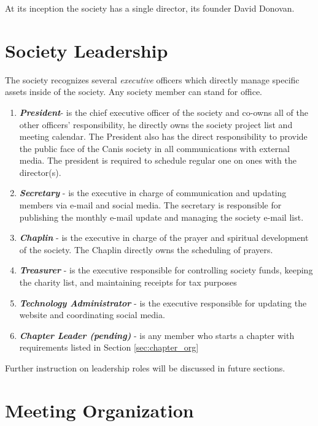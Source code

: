 \documentclass[]{article}
\begin{document}
\noindent 
At its inception the society has a single director, its founder David Donovan. 

\clearpage

\section{Society Leadership}
\label{sec:leadership}

The society recognizes several \textit{executive} officers which directly manage specific assets inside of the society. Any society member can stand for office. 

\begin{enumerate}
	\item \textbf{\textit{President}}- is the chief executive officer of the society and co-owns all of the other officers' responsibility, he directly owns the society project list and meeting calendar. The President also has the direct responsibility to provide the public face of the Canis society in all communications with external media. The president is required to schedule regular one on ones with the director(s).
	\item \textbf{\textit{Secretary}} - is the executive in charge of communication and updating members via e-mail and social media. The secretary is responsible for publishing the monthly e-mail update and managing the society e-mail list.
	\item \textbf{\textit{Chaplin}} - is the executive in charge of the prayer and spiritual development of the society. The Chaplin directly owns the scheduling of prayers. 
	\item \textbf{\textit{Treasurer}} - is the executive responsible for controlling society funds, keeping the charity list, and maintaining receipts for tax purposes
	\item \textbf{\textit{Technology Administrator}} - is the executive responsible for updating the website and coordinating social media.
	\item \textbf{\textit{Chapter Leader (pending)} }- is any member who starts a chapter with requirements listed in Section \ref{sec:chapter_org}
\end{enumerate}

\noindent
Further instruction on leadership roles will be discussed in future sections. 

\clearpage

\section{Meeting Organization}
\label{sec:meeting_org}
\end{document}

